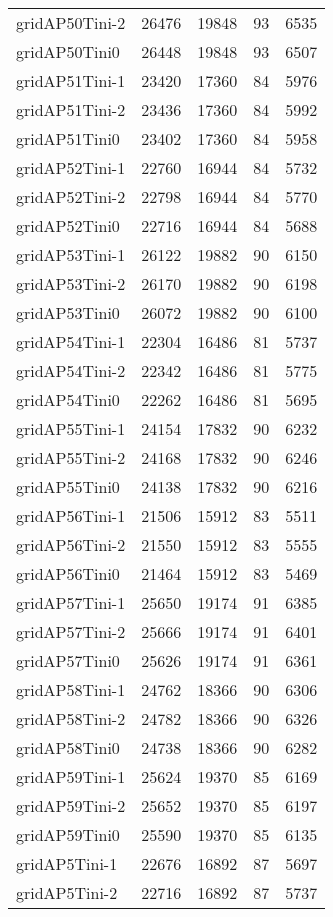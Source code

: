 \begin{longtable}{lrrrr}
gridAP50Tini-2 & 26476 & 19848 & 93 & 6535 \\
gridAP50Tini0 & 26448 & 19848 & 93 & 6507 \\
gridAP51Tini-1 & 23420 & 17360 & 84 & 5976 \\
gridAP51Tini-2 & 23436 & 17360 & 84 & 5992 \\
gridAP51Tini0 & 23402 & 17360 & 84 & 5958 \\
gridAP52Tini-1 & 22760 & 16944 & 84 & 5732 \\
gridAP52Tini-2 & 22798 & 16944 & 84 & 5770 \\
gridAP52Tini0 & 22716 & 16944 & 84 & 5688 \\
gridAP53Tini-1 & 26122 & 19882 & 90 & 6150 \\
gridAP53Tini-2 & 26170 & 19882 & 90 & 6198 \\
gridAP53Tini0 & 26072 & 19882 & 90 & 6100 \\
gridAP54Tini-1 & 22304 & 16486 & 81 & 5737 \\
gridAP54Tini-2 & 22342 & 16486 & 81 & 5775 \\
gridAP54Tini0 & 22262 & 16486 & 81 & 5695 \\
gridAP55Tini-1 & 24154 & 17832 & 90 & 6232 \\
gridAP55Tini-2 & 24168 & 17832 & 90 & 6246 \\
gridAP55Tini0 & 24138 & 17832 & 90 & 6216 \\
gridAP56Tini-1 & 21506 & 15912 & 83 & 5511 \\
gridAP56Tini-2 & 21550 & 15912 & 83 & 5555 \\
gridAP56Tini0 & 21464 & 15912 & 83 & 5469 \\
gridAP57Tini-1 & 25650 & 19174 & 91 & 6385 \\
gridAP57Tini-2 & 25666 & 19174 & 91 & 6401 \\
gridAP57Tini0 & 25626 & 19174 & 91 & 6361 \\
gridAP58Tini-1 & 24762 & 18366 & 90 & 6306 \\
gridAP58Tini-2 & 24782 & 18366 & 90 & 6326 \\
gridAP58Tini0 & 24738 & 18366 & 90 & 6282 \\
gridAP59Tini-1 & 25624 & 19370 & 85 & 6169 \\
gridAP59Tini-2 & 25652 & 19370 & 85 & 6197 \\
gridAP59Tini0 & 25590 & 19370 & 85 & 6135 \\
gridAP5Tini-1 & 22676 & 16892 & 87 & 5697 \\
gridAP5Tini-2 & 22716 & 16892 & 87 & 5737 \\

\end{longtable}
